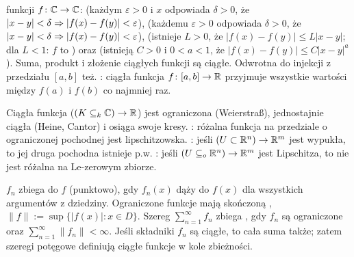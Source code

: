   funkcji $f \colon \mathbb{C} \to \mathbb{C}$:  (każdym $\varepsilon > 0$ i $x$  odpowiada $\delta > 0$, że $|x-y| < \delta \Rightarrow |f(x) - f(y)| < \varepsilon$),  (każdemu $\varepsilon > 0$ odpowiada $\delta > 0$, że $|x-y| < \delta \Rightarrow |f(x)-f(y)|<\varepsilon$),  (istnieje $L > 0$, że $|f(x) - f(y)| \le L |x-y|$; dla $L < 1$: $f$ to ) oraz   (istnieją $C > 0$ i $0 < a < 1$, że $|f(x) - f(y)| \le C |x-y|^a$).
Suma, produkt i złożenie ciągłych funkcji są ciągłe.
Odwrotna do injekcji z przedziału $[a,b]$ też.
: ciągła funkcja $f \colon [a,b] \to \mathbb{R}$ przyjmuje wszystkie wartości między $f(a)$ i $f(b)$ co najmniej raz. %

Ciągła  funkcja ($(K \subseteq_k \mathbb{C}) \to \mathbb{R}$) jest ograniczona (Weierstraß), jednostajnie ciągła (Heine, Cantor) i osiąga swoje kresy.
: różalna funkcja na przedziale o ograniczonej pochodnej jest lipschitzowska.
: jeśli $(U \subset \mathbb{R}^n) \to \mathbb{R}^m$ jest wypukła, to jej druga pochodna istnieje p.w.
: jeśli $(U \subseteq_o \mathbb{R}^n ) \to \mathbb{R}^m$ jest Lipschitza, to nie jest różalna na Le-zerowym zbiorze.

  $f_n$ zbiega do $f$ (punktowo), gdy $f_n(x)$ dąży do $f(x)$ dla wszystkich argumentów z dziedziny.
Ograniczone funkcje mają skończoną , $\|f\| := \sup\{|f(x)| : x \in D\}$.
Szereg $\sum_{n=1}^\infty f_n$ zbiega , gdy $f_n$ są ograniczone oraz $\sum_{n=1}^\infty \|f_n\| < \infty$.
Jeśli składniki $f_n$ są ciągłe, to cała suma także; zatem szeregi potęgowe definiują ciągłe funkcje w kole zbieżności.